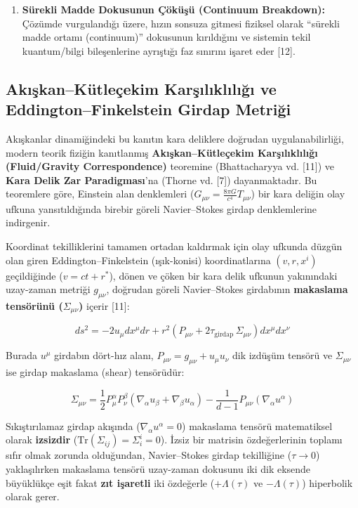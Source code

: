 \documentclass[12pt,a4paper]{article}
\begin{document}
\begin{enumerate}
    \item \textbf{Sürekli Madde Dokusunun Çöküşü (Continuum Breakdown):} Çözümde vurgulandığı üzere, hızın sonsuza gitmesi fiziksel olarak ``sürekli madde ortamı (continuum)'' dokusunun kırıldığını ve sistemin tekil kuantum/bilgi bileşenlerine ayrıştığı faz sınırını işaret eder [12].
\end{enumerate}

\subsection{Akışkan--Kütleçekim Karşılıklılığı ve Eddington--Finkelstein Girdap Metriği}

Akışkanlar dinamiğindeki bu kanıtın kara deliklere doğrudan uygulanabilirliği, modern teorik fiziğin kanıtlanmış \textbf{Akışkan--Kütleçekim Karşılıklılığı (Fluid/Gravity Correspondence)} teoremine (Bhattacharyya vd. [11]) ve \textbf{Kara Delik Zar Paradigması}'na (Thorne vd. [7]) dayanmaktadır. Bu teoremlere göre, Einstein alan denklemleri ($G_{\mu\nu} = \frac{8\pi G}{c^4} T_{\mu\nu}$) bir kara deliğin olay ufkuna yansıtıldığında birebir göreli Navier--Stokes girdap denklemlerine indirgenir.

Koordinat tekilliklerini tamamen ortadan kaldırmak için olay ufkunda düzgün olan giren Eddington--Finkelstein (ışık-konisi) koordinatlarına $(v, r, x^i)$ geçildiğinde ($v = ct + r^*$), dönen ve çöken bir kara delik ufkunun yakınındaki uzay-zaman metriği $g_{\mu\nu}$, doğrudan göreli Navier--Stokes girdabının \textbf{makaslama tensörünü ($\Sigma_{\mu\nu}$)} içerir [11]:

\begin{equation}
ds^2 = -2 u_\mu dx^\mu dr + r^2 \left( P_{\mu\nu} + 2 \tau_{\text{girdap}} \, \Sigma_{\mu\nu} \right) dx^\mu dx^\nu
\end{equation}

Burada $u^\mu$ girdabın dört-hız alanı, $P_{\mu\nu} = g_{\mu\nu} + u_\mu u_\nu$ dik izdüşüm tensörü ve $\Sigma_{\mu\nu}$ ise girdap makaslama (shear) tensörüdür:

\begin{equation}
\Sigma_{\mu\nu} = \frac{1}{2} P_\mu^\alpha P_\nu^\beta \left( \nabla_\alpha u_\beta + \nabla_\beta u_\alpha \right) - \frac{1}{d-1} P_{\mu\nu} (\nabla_\alpha u^\alpha)
\end{equation}

Sıkıştırılamaz girdap akışında ($\nabla_\alpha u^\alpha = 0$) makaslama tensörü matematiksel olarak \textbf{izsizdir} ($\text{Tr}(\Sigma_{ij}) = \Sigma^i_i = 0$). İzsiz bir matrisin özdeğerlerinin toplamı sıfır olmak zorunda olduğundan, Navier--Stokes girdap tekilliğine ($\tau \to 0$) yaklaşılırken makaslama tensörü uzay-zaman dokusunu iki dik eksende büyüklükçe eşit fakat \textbf{zıt işaretli} iki özdeğerle ($+\Lambda(\tau)$ ve $-\Lambda(\tau)$) hiperbolik olarak gerer. 
\end{document}
